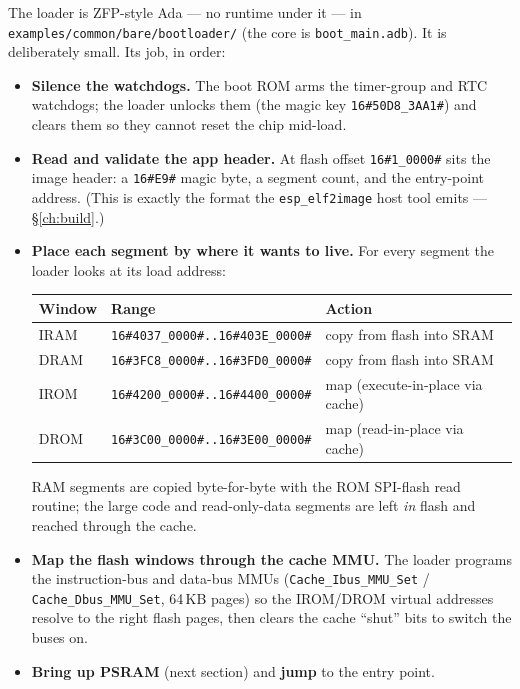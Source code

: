 The loader is ZFP-style Ada --- no runtime under it --- in
\texttt{examples/common/bare/bootloader/} (the core is \texttt{boot\_main.adb}).
It is deliberately small. Its job, in order:

\begin{itemize}
\item \textbf{Silence the watchdogs.} The boot ROM arms the timer-group and RTC
  watchdogs; the loader unlocks them (the magic key \texttt{16\#50D8\_3AA1\#}) and
  clears them so they cannot reset the chip mid-load.
\item \textbf{Read and validate the app header.} At flash offset
  \texttt{16\#1\_0000\#} sits the image header: a \texttt{16\#E9\#} magic byte, a segment
  count, and the entry-point address. (This is exactly the format the
  \texttt{esp\_elf2image} host tool emits --- \S\ref{ch:build}.)
\item \textbf{Place each segment by where it wants to live.} For every segment
  the loader looks at its load address:
\begin{center}
\begin{tabular}{l l l}
\toprule
\textbf{Window} & \textbf{Range} & \textbf{Action} \\ \midrule
IRAM   & \texttt{16\#4037\_0000\#..16\#403E\_0000\#} & copy from flash into SRAM \\
DRAM   & \texttt{16\#3FC8\_0000\#..16\#3FD0\_0000\#} & copy from flash into SRAM \\
IROM   & \texttt{16\#4200\_0000\#..16\#4400\_0000\#} & map (execute-in-place via cache) \\
DROM   & \texttt{16\#3C00\_0000\#..16\#3E00\_0000\#} & map (read-in-place via cache) \\
\bottomrule
\end{tabular}
\end{center}
  RAM segments are copied byte-for-byte with the ROM SPI-flash read routine; the
  large code and read-only-data segments are left \emph{in} flash and reached
  through the cache.
\item \textbf{Map the flash windows through the cache MMU.} The loader programs
  the instruction-bus and data-bus MMUs (\texttt{Cache\_Ibus\_MMU\_Set} /
  \texttt{Cache\_Dbus\_MMU\_Set}, 64\,KB pages) so the IROM/DROM virtual
  addresses resolve to the right flash pages, then clears the cache ``shut'' bits
  to switch the buses on.
\item \textbf{Bring up PSRAM} (next section) and \textbf{jump} to the entry point.
\end{itemize}

